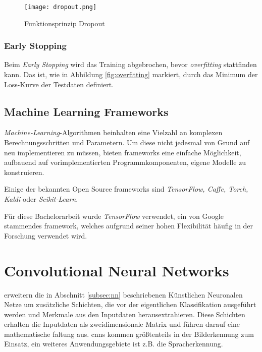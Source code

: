 \begin{figure}[H]
    \centering
    \texttt{[image: dropout.png]}
    \caption{Funktionsprinzip Dropout 
    \cite{JMLR:v15:srivastava14a}}
    \label{fig:dropout}
\end{figure}

\subsubsection{Early Stopping}
Beim \textit{Early Stopping} wird das Training abgebrochen, 
bevor \textit{\Gls{overfitting}} stattfinden kann.
Das ist, wie in Abbildung \ref{fig:overfitting}
markiert, durch das Minimum der Loss-Kurve der Testdaten 
definiert.


\subsection{Machine Learning Frameworks}

\textit{Machine-Learning}-Algorithmen beinhalten eine
Vielzahl an komplexen Berechnungsschritten und Parametern.
Um diese nicht jedesmal von Grund auf neu implementieren zu müssen,
bieten \Glspl{framework} eine einfache Möglichkeit, 
aufbauend auf vorimplementierten Programmkomponenten,
eigene Modelle zu konstruieren.

Einige der bekannten Open Source \Glspl{framework} sind
\textit{TensorFlow, Caffe, Torch, Kaldi} oder \textit{Scikit-Learn}.

Für diese Bachelorarbeit wurde \textit{TensorFlow} verwendet,
ein von Google stammendes \Gls{framework},
welches aufgrund seiner hohen Flexibilität häufig in
der Forschung verwendet wird.



\section{Convolutional Neural Networks}\label{subsec:cnn}

 erweitern die in Abschnitt \ref{subsec:nn} beschriebenen
Künstlichen Neuronalen Netze um zusätzliche Schichten,
die vor der eigentlichen Klassifikation ausgeführt werden
und Merkmale aus den Inputdaten herausextrahieren.
Diese Schichten erhalten die Inputdaten als
zweidimensionale Matrix und führen darauf eine 
mathematische \Gls{faltung} aus.
\Glspl{cnn} kommen größtenteils in der Bilderkennung zum 
Einsatz, ein weiteres Anwendungsgebiete ist 
z.B. die Spracherkennung.

